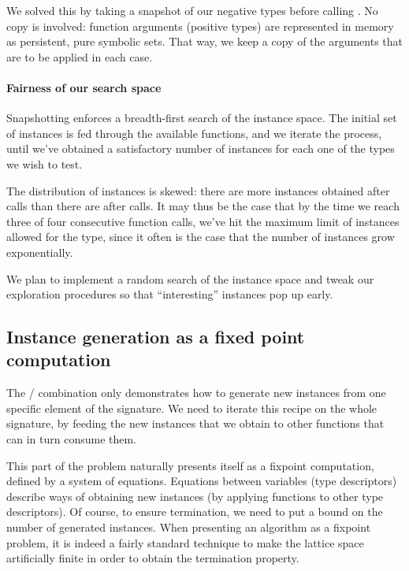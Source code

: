We solved this by taking a snapshot of our negative types before calling
. No copy is involved: function arguments (positive types) are
represented in memory as persistent, pure symbolic sets. That way, we keep a
copy of the arguments that are to be applied in each  case.

\paragraph{Fairness of our search space}
Snapshotting enforces a breadth-first search of the instance space. The initial
set of instances is fed through the available functions, and we iterate the
process, until we've obtained a satisfactory number of instances for each one of
the types we wish to test.

The distribution of instances is skewed: there are more instances obtained after
 calls than there are after  calls. It may thus be the case
that by the time we reach three of four consecutive function calls, we've hit
the maximum limit of instances allowed for the type, since it often is the case
that the number of instances grow exponentially.

We plan to implement a random search of the instance space and tweak our
exploration procedures so that ``interesting'' instances pop up early.

\subsection{Instance generation as a fixed point computation}

The / combination only demonstrates how to generate
new instances from one specific element of the signature. We need to iterate
this recipe on the whole signature, by feeding the new instances that we
obtain to other functions that can in turn consume them.

This part of the problem naturally presents itself as a fixpoint computation,
defined by a system of equations. Equations between variables (type descriptors)
describe ways of obtaining new instances (by applying functions to other type
descriptors). Of course, to ensure termination, we need to put a bound on the
number of generated instances. When presenting an algorithm as a fixpoint
problem, it is indeed a fairly standard technique to make the lattice space
artificially finite in order to obtain the termination property.


